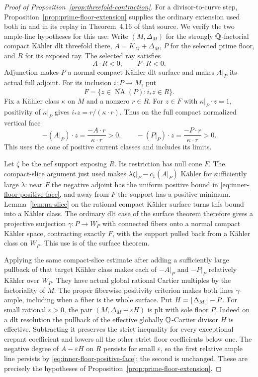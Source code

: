 \begin{proof}[Proof of Proposition~\ref{prop:threefold-contraction}]
For a divisor-to-curve step, Proposition~\ref{prop:prime-floor-extension}
supplies the ordinary extension used both in
\cite[Theorem~3.1, Claim~3.2]{DasHacon2024} and in its replay in
Theorem~4.16 of that source.  We verify the two ample-line hypotheses
for this use.  Write \((M,\Delta_M)\) for the strongly
\(\mathbb Q\)-factorial compact K\"ahler dlt threefold there,
\(A=K_M+\Delta_M\), \(P\) for the selected prime floor, and \(R\)
for its exposed ray.  The selected ray satisfies
\[
 A\cdot R<0,\qquad P\cdot R<0.
\]
Adjunction makes \(P\) a normal compact K\"ahler dlt surface and makes
\(A|_P\) its actual full adjoint.  For its inclusion \(i:P\to M\), put
\[
 F=\{z\in\overline{\operatorname{NA}}(P):i_*z\in R\}.
\]
Fix a K\"ahler class \(\kappa\) on \(M\) and a nonzero \(r\in R\).
For \(z\in F\) with \(\kappa|_P\cdot z=1\), positivity of
\(\kappa|_P\) gives \(i_*z=r/(\kappa\cdot r)\).  Thus on the full
compact normalized vertical face
\begin{equation}\label{eq:inner-floor-positive-face}
 -(A|_P)\cdot z=\frac{-A\cdot r}{\kappa\cdot r}>0,
 \qquad
 -(P|_P)\cdot z=\frac{-P\cdot r}{\kappa\cdot r}>0 .
\end{equation}
This uses the cone of positive current classes and includes its limits.

Let \(\zeta\) be the nef support exposing \(R\).  Its restriction has
null cone \(F\).  The compact-slice argument just used makes
\(\lambda\zeta|_P-c_1(A|_P)\) K\"ahler for sufficiently large
\(\lambda\): near \(F\) the negative adjoint has the uniform positive
bound in \eqref{eq:inner-floor-positive-face}, and away from \(F\)
the support has a positive minimum.  Lemma~\ref{lem:na-slice} on the
rational compact K\"ahler surface turns this bound into a K\"ahler
class.  The ordinary dlt case of the surface theorem
\cite[Theorem~2.32]{DasHaconYanez2026} therefore gives a projective
surjection \(\gamma:P\to W_P\) with connected fibers onto a normal
compact K\"ahler space, contracting exactly \(F\), with the support
pulled back from a K\"ahler class on \(W_P\).  This use is of the
surface theorem.

Applying the same compact-slice estimate after adding a sufficiently
large pullback of that target K\"ahler class makes each of
\(-A|_P\) and \(-P|_P\) relatively K\"ahler over \(W_P\).
They have actual global rational Cartier multiples by the factoriality
of \(M\).  The proper fiberwise positivity criterion makes both lines
\(\gamma\)-ample, including when a fiber is the whole surface.
Put \(H=\left\lfloor \Delta_M\right\rfloor-P\).  For small rational \(\varepsilon>0\),
the pair \((M,\Delta_M-\varepsilon H)\) is plt with sole floor \(P\).
Indeed on a dlt resolution the pullback of the effective globally
\(\mathbb Q\)-Cartier divisor \(H\) is effective.  Subtracting it preserves
the strict inequality for every exceptional crepant coefficient and
lowers all the other strict floor coefficients below one.  The negative
degree of \(A-\varepsilon H\) on \(R\) persists for small
\(\varepsilon\), so the first relative ample line persists by
\eqref{eq:inner-floor-positive-face}; the second is unchanged.
These are precisely the hypotheses of
Proposition~\ref{prop:prime-floor-extension}.


\end{proof}
